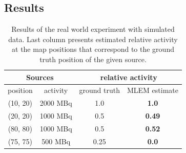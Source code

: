 \subsection{Results}
\begin{table}[htb]
\begin{center}
  \begin{tabular}{ |c|c|c|c| } 
 \hline
    \multicolumn{2}{|c}{Sources} &  \multicolumn{2}{|c|}{ relative activity } \\
 \hline
    position & activity & ground truth & MLEM estimate\\ 
 \hline
    (10, 20) & 2000 MBq & 1.0  & \textbf{1.0} \\ 
    (20, 20) & 1000 MBq &  0.5 & \textbf{0.49} \\ 
    (80, 80) & 1000 MBq &  0.5 & \textbf{0.52} \\ 
    (75, 75) & 500 MBq &  0.25 & \textbf{0.0} \\ 
 \hline
\end{tabular}
  \caption{Results of the real world experiment with simulated data. Last column presents estimated relative activity at the map positions that correspond to the ground truth position of the given source.}
  \label{tab:temenight_results}
\end{center}
\end{table}











